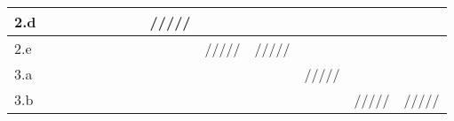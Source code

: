 \begin{table}[ht]
{\begin{tabular}{@{} | l | l | l | l | l | l | l | l | l | l | l | l | l | l | @{}}
      2.d                                                      &              &              &              &              &              &              &              & /////        &              &              &              &              &              \\ \midrule
      2.e                                                      &              &              &              &              &              &              &              &              & /////        & /////        &              &              &              \\ \toprule
      3.a                                                      &              &              &              &              &              &              &              &              &              &              & /////        &              &              \\ \midrule
      3.b                                                      &              &              &              &              &              &              &              &              &              &              &              & /////        & /////        \\ \bottomrule
    \end{tabular}
  }
\end{table}

